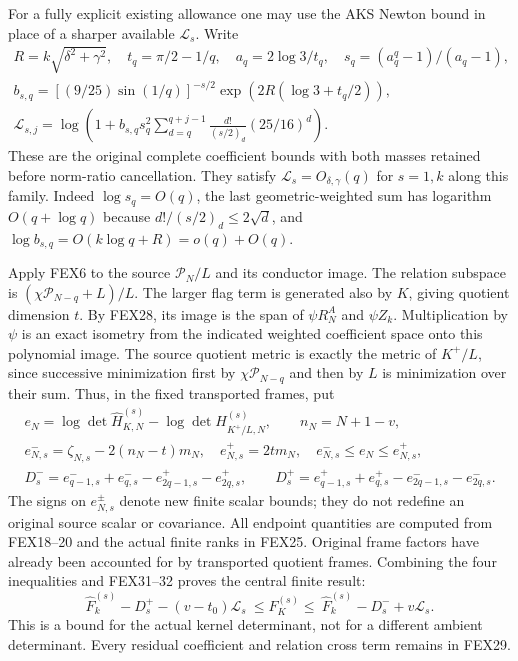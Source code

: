 \documentclass[11pt,a4paper]{article}
\begin{document}
For a fully explicit existing allowance one may use the AKS Newton
bound in place of a sharper available $\mathcal L_s$. Write
\[
\begin{gathered}
 R=k\sqrt{\delta^2+\gamma^2},\quad
 t_q=\pi/2-1/q,\quad a_q=2\log3/t_q,\quad
 s_q=(a_q^q-1)/(a_q-1),\\
 b_{s,q}=[(9/25)\sin(1/q)]^{-s/2}
          \exp(2R(\log3+t_q/2)),\\
 \mathcal L_{s,j}=\log\left(1+b_{s,q}s_q^2
                  \sum_{d=q}^{q+j-1}\frac{d!}{(s/2)_d}(25/16)^d\right).
\end{gathered}\tag{FEX33}
\]
These are the original complete coefficient bounds with both masses
retained before norm-ratio cancellation. They satisfy
$\mathcal L_s=O_{\delta,\gamma}(q)$ for $s=1,k$ along this family.
Indeed $\log s_q=O(q)$, the last geometric-weighted sum has logarithm
$O(q+\log q)$ because $d!/(s/2)_d\le2\sqrt d$, and
$\log b_{s,q}=O(k\log q+R)=o(q)+O(q)$.

Apply FEX6 to the source $\mathcal P_N/L$ and its conductor image.
The relation subspace is $(\chi\mathcal P_{N-q}+L)/L$. The larger
flag term is generated also by $K$, giving quotient dimension $t$.
By FEX28, its image is the span of $\psi R_N^A$ and $\psi Z_k$.
Multiplication by $\psi$ is an exact isometry from the indicated
weighted coefficient space onto this polynomial image. The source
quotient metric is exactly the metric of $K^+/L$, since successive
minimization first by $\chi\mathcal P_{N-q}$ and then by $L$ is
minimization over their sum. Thus, in the fixed transported frames, put
\[
\begin{gathered}
 e_N=\log\det\widehat H_{K,N}^{(s)}-
                    \log\det H_{K^+/L,N}^{(s)},\qquad n_N=N+1-v,\\
 e^-_{N,s}=\zeta_{N,s}-2(n_N-t)m_N,\quad e^+_{N,s}=2tm_N,
 \quad e^-_{N,s}\le e_N\le e^+_{N,s},\\
 D_s^-=e^-_{q-1,s}+e^-_{q,s}-e^+_{2q-1,s}-e^+_{2q,s},\qquad
 D_s^+=e^+_{q-1,s}+e^+_{q,s}-e^-_{2q-1,s}-e^-_{2q,s}.
\end{gathered}\tag{FEX34}
\]
The signs on $e_{N,s}^{\pm}$ denote new finite scalar bounds; they do not
redefine an original source scalar or covariance. All endpoint quantities are computed from FEX18--20 and the
actual finite ranks in FEX25. Original frame factors have already been
accounted for by transported quotient frames. Combining the four
inequalities and FEX31--32 proves the central finite result:
\[
 \boxed{\quad
 \widehat F_k^{(s)}-D_s^+-(v-t_0)\mathcal L_s
 \ \le F_K^{(s)}\le\
 \widehat F_k^{(s)}-D_s^-+v\mathcal L_s.
 \quad}\tag{FEX35}
\]
This is a bound for the actual kernel determinant, not for a different
ambient determinant. Every residual coefficient and relation cross
term remains in FEX29.
\end{document}
